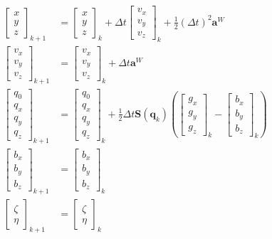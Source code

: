 \begin{align}
	\begin{bmatrix}
		x \\ y \\ z 
	\end{bmatrix}_{k+1}
	&= 
	\begin{bmatrix}
		x \\ y \\ z 
	\end{bmatrix}_{k}
	+ \varDelta t
	\begin{bmatrix}
	v_x \\ v_y \\ v_z 
	\end{bmatrix}_{k}
	+ \frac{1}{2} (\varDelta t)^2 \bm{a}^W
	\label{state_begin}
	\\
	\begin{bmatrix}
		v_x \\ v_y \\ v_z 
	\end{bmatrix}_{k+1}
	&= 
	\begin{bmatrix}
		v_x \\ v_y \\ v_z 
	\end{bmatrix}_{k}
	+ \varDelta t \bm{a}^W
	\\
	\begin{bmatrix}
		q_0 \\ q_x \\ q_y \\ q_z 
	\end{bmatrix}_{k+1}
	&= 
	\begin{bmatrix}
		q_0 \\ q_x \\ q_y \\ q_z  
	\end{bmatrix}_{k}
	+ \frac{1}{2} \varDelta t \bm{S} \left( \bm{q}_k \right) 
	\left(
	\begin{bmatrix}
		g_x \\ g_y \\ g_z
	\end{bmatrix}_{k}
	-
	\begin{bmatrix}
		b_x \\ b_y \\ b_z
	\end{bmatrix}_{k}
	\right)
	\\
	\begin{bmatrix}
		b_x \\ b_y \\ b_z
	\end{bmatrix}_{k+1}
	&= 
	\begin{bmatrix}
		b_x \\ b_y \\ b_z 
	\end{bmatrix}_{k}	
	\\
	\begin{bmatrix}
		\zeta \\ \eta 
	\end{bmatrix}_{k+1}
	&= 
	\begin{bmatrix}
		\zeta \\ \eta 
	\end{bmatrix}_{k}	
\end{align}

